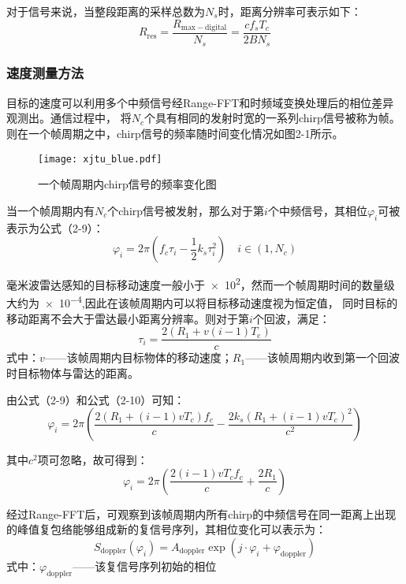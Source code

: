 对于信号来说，当整段距离的采样总数为$N_{s}$时，距离分辨率可表示如下：
\begin{equation}
    R_{\mathrm{res}}=\frac{R_{\mathrm{max-digital}}}{N_{s}}=\frac{cf_{s}T_{c}}{2BN_{s}}
\end{equation}

\subsubsection{速度测量方法}

目标的速度可以利用多个中频信号经Range-FFT和时频域变换处理后的相位差异观测出\cite{song2014velocity}。通信过程中，
将$N_{c}$个具有相同的发射时宽的一系列chirp信号被称为帧。则在一个帧周期之中，chirp信号的频率随时间变化情况如图2-1所示。
\begin{figure}[H]
    \centering
    \texttt{[image: xjtu\_blue.pdf]}
    \caption{一个帧周期内chirp信号的频率变化图}
\end{figure}
当一个帧周期内有$N_{c}$个chirp信号被发射，那么对于第$i$个中频信号，其相位$\varphi_{i}$可被表示为公式（2-9）：
\begin{equation}
    \varphi_{i}=2\pi\left(f_{c}\tau_{i}-\frac12k_{s}\tau_{i}^{2}\right)\quad i\in\left(1,N_{c}\right)
\end{equation}

毫米波雷达感知的目标移动速度一般小于\num{e2}，然而一个帧周期时间的数量级大约为\num{e-4},因此在该帧周期内可以将目标移动速度视为恒定值，
同时目标的移动距离不会大于雷达最小距离分辨率。则对于第$i$个回波，满足：
\begin{equation}
    \tau_{i}=\frac{2\left(R_{1}+v(i-1)T_{\mathrm{c}}\right)}{c}
\end{equation}
式中：$v$——该帧周期内目标物体的移动速度；$R_{1}$——该帧周期内收到第一个回波时目标物体与雷达的距离。

由公式（2-9）和公式（2-10）可知：
\begin{equation}
    \varphi_{i}=2\pi\left(\frac{2\left(R_{1}+\left(i-1\right)v T_{c}\right)f_{c}}{c}-\frac{2k_{s}\left(R_{1}+\left(i-1\right)v T_{c}\right)^{2}}{c^{2}}\right)
\end{equation}

其中$c^{2}$项可忽略，故可得到：
\begin{equation}
    \varphi_{i}=2\pi\left(\frac{2\left(i-1\right)v T_{c}f_{c}}{c}+\frac{2R_{1}}{c}\right)
\end{equation}

经过Range-FFT后，可观察到该帧周期内所有chirp的中频信号在同一距离上出现的峰值复包络能够组成新的复信号序列，其相位变化可以表示为：
\begin{equation}
    S_{\mathrm{doppler}}\left(\varphi_{i}\right)=A_{\mathrm{doppler}}\exp\left(j\cdot\varphi_{i}+\varphi_{\mathrm{doppler}}\right)
\end{equation}
式中：$\varphi_{\mathrm{doppler}}$——该复信号序列初始的相位

